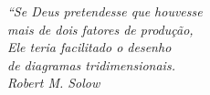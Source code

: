 \begin{epigrafe}
    \vspace*{\fill}
	\begin{flushright}
		\textit{``Se Deus pretendesse que houvesse\\
        mais de dois fatores de produção,\\
        Ele teria facilitado o desenho\\
        de diagramas tridimensionais.\\
        Robert M. Solow
		}
	\end{flushright}
\end{epigrafe}
